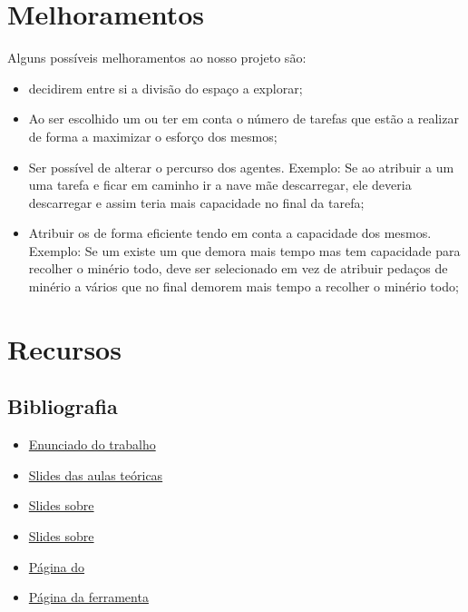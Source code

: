\documentclass[12pt]{report}
\begin{document}
\chapter{Melhoramentos}


Alguns possíveis melhoramentos ao nosso projeto são:

\begin{itemize}
	\item \Spotters decidirem entre si a divisão do espaço a explorar;
	\item Ao ser escolhido um \producer ou \transporter ter em conta o número de tarefas que estão a realizar de forma a maximizar o esforço dos mesmos;
	\item Ser possível de alterar o percurso dos agentes. Exemplo: Se ao atribuir a um \transporter uma tarefa e ficar em caminho ir a nave mãe descarregar, ele deveria descarregar e assim teria mais capacidade no final da tarefa;
	\item Atribuir os \transporters de forma eficiente tendo em conta a capacidade dos mesmos. Exemplo: Se um existe um \transporter que demora mais tempo mas tem capacidade para recolher o minério todo, deve ser selecionado em vez de atribuir pedaços de minério a vários \transporters que no final demorem mais tempo a recolher o minério todo;
\end{itemize}

\chapter{Recursos}

\section{Bibliografia}

\begin{itemize}
	\item \href{https://paginas.fe.up.pt/~eol/AIAD/1617/trabalhos.html#T05}{Enunciado do trabalho}
	\item \href{https://paginas.fe.up.pt/~eol/AIAD/aiad1617.html}{Slides das aulas teóricas}
	\item \href{https://paginas.fe.up.pt/~eol/AIAD/aulas/jade_en.pdf}{Slides sobre \jade}
	\item \href{https://paginas.fe.up.pt/~eol/AIAD/aulas/REPAST_intro_hlc.pdf}{Slides sobre \repast}
	\item \href{https://web.fe.up.pt/~hlc/doku.php?id=sajas}{Página do \sajas}
	\item \href{https://web.fe.up.pt/~hlc/doku.php?id=massim2dev}{Página da ferramenta \massim}
\end{itemize}
\end{document}
